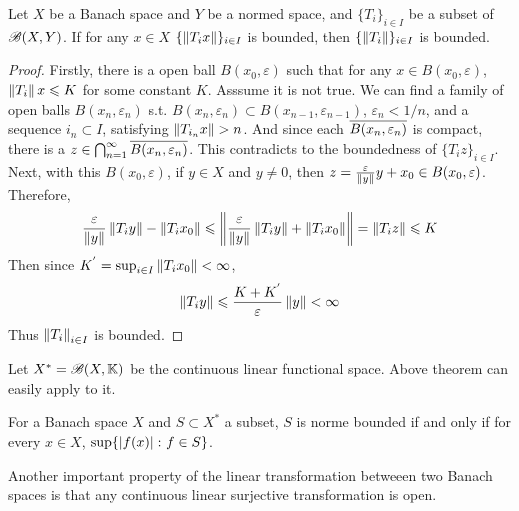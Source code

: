 \documentclass[a4paper,11pt]{report}
\begin{document}
\begin{thm}
	Let $X$ be a Banach space and $Y$ be a normed space, and $\{T_i\}_{i \in I}$ be a subset of $\mathscr{B}(X,Y)$. If for any $x \in X$ $\{\left\lVert T_i x\right\lVert\}_{i \in I}$ is bounded, then $\{\left\lVert T_i\right\lVert\}_{i \in I}$ is bounded.
\end{thm}
\begin{proof}
	Firstly, there is a open ball $B(x_0, \varepsilon)$ such that for any $x \in B(x_0, \varepsilon)$, $\left\lVert T_i\right\lVert x \leqslant K$ for some constant $K$. Asssume it is not true. We can find a family of open balls $B(x_n, \varepsilon_n)$ s.t. $B(x_n, \varepsilon_n) \subset B(x_{n-1}, \varepsilon_{n-1})$, $\varepsilon_n < 1/n$, and a sequence ${i_n} \subset I$, satisfying $\left\lVert T_{i_n}x\right\lVert > n$. And since each $\overline{B(x_n, \varepsilon_n)}$ is compact, there is a $z \in \bigcap_{n=1}^{\infty} \overline{B(x_n, \varepsilon_n)}$. This contradicts to the boundedness of $\{T_i z\}_{i \in I}$.\\
	Next, with this $B(x_0, \varepsilon)$, if $y \in X$ and $y \neq 0$, then $z = \frac{\varepsilon}{\left\lVert y\right\lVert}y + x_0 \in B(x_0, \varepsilon)$. Therefore,
	\begin{equation*}
		\frac{\varepsilon}{\left\lVert y\right\lVert} \left\lVert T_i y\right\lVert - \left\lVert T_i x_0\right\lVert \leqslant \left\lVert\frac{\varepsilon}{\left\lVert y\right\lVert} \left\lVert T_i y\right\lVert + \left\lVert T_i x_0\right\lVert\right\lVert = \left\lVert T_i z\right\lVert \leqslant K
	\end{equation*}
	Then since $K^{'} = \sup_{i \in I}{\left\lVert T_i x_0\right\lVert} < \infty$, 
	\begin{equation*}
		\left\lVert T_i y\right\lVert \leqslant \frac{K+K^{'}}{\varepsilon} \left\lVert y\right\lVert < \infty
	\end{equation*}
	Thus ${\left\lVert T_i\right\lVert}_{i \in I}$ is bounded.
\end{proof}
\begin{rem}
	Let $X^{*} = \mathscr{B}(X,\mathbb{K})$ be the continuous linear functional space. Above theorem can easily apply to it.
\end{rem}
\begin{cor}
	For a Banach space $X$ and $S \subset X^{*}$ a subset, $S$ is norme bounded if and only if for every $x \in X$, $\sup\{\left\lvert f(x)\right\lvert \colon f \in S\}$.
\end{cor}

Another important property of the linear transformation betweeen two Banach spaces is that any continuous linear surjective transformation is open.
\end{document}
